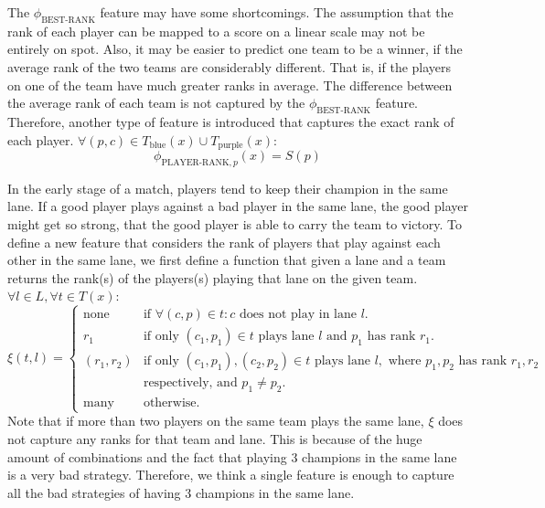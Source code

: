 The $\phi_\text{BEST-RANK}$ feature may have some shortcomings. The assumption that the rank of each player can be mapped to a score on a linear scale may not be entirely on spot.
Also, it may be easier to predict one team to be a winner, if the average rank of the two teams are considerably different. That is, if the players on one of the team have much greater ranks in average. The difference between the average rank of each team is not captured by the $\phi_\text{BEST-RANK}$ feature.
Therefore, another type of feature is introduced that captures the exact rank of each player.
$\forall(p, c) \in T_\text{blue}(x) \cup T_\text{purple}(x)$:
\begin{equation}\label{eq:playerrank}
\phi_{\text{PLAYER-RANK},p}(x) = S(p)  
\end{equation}

In the early stage of a match, players tend to keep their champion in the same lane.
If a good player plays against a bad player in the same lane, the good player might get so strong, that the good player is able to carry the team to victory.
To define a new feature that considers the rank of players that play against each other in the same lane,
we first define a function that given a lane and a team returns the rank(s) of the players(s) playing that lane on the given team.
$\forall l \in L, \forall t \in T(x)$:
\begin{equation}\label{eq:xi}
  \xi(t,l) =
\begin{cases} 
  \text{none} & \text{if } \forall(c, p) \in t: c \text{ does not play in lane } l. \\
  r_1 & \text{if only } (c_1, p_1) \in t \text{ plays lane } l \text{ and } p_1 \text{ has rank } r_1 \text{.}\\
  (r_1, r_2) & \text{if only } (c_1, p_1), (c_2, p_2) \in t \text{ plays lane } l, \text{ where } p_1, p_2 \text{ has rank } r_1, r_2\\ 
&\text{respectively, and } p_1 \neq p_2.\\
  \text{many} & \text{otherwise}.
\end{cases}
\end{equation}
Note that if more than two players on the same team plays the same lane, $\xi$ does not capture any ranks for that team and lane. This is because of the huge amount of combinations and the fact that playing 3 champions in the same lane is a very bad strategy. Therefore, we think a single feature is enough to capture all the bad strategies of having 3 champions in the same lane.
 
